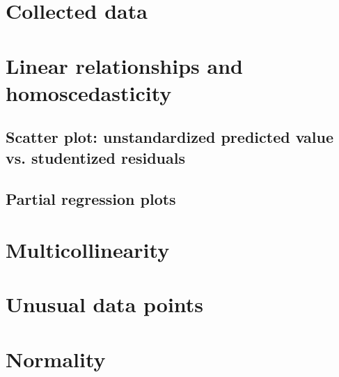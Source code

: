 \documentclass{sigchi}
\begin{document}




\clearpage
\onecolumn

\appendix
\section{Collected data} %
\label{sec:collected_data}


\section{Linear relationships and homoscedasticity}
\label{app:linear_relationships}

\subsection{Scatter plot: unstandardized predicted value vs. studentized residuals}
\hfill \break

\clearpage

\subsection{Partial regression plots}
\hfill \break


\clearpage

\section{Multicollinearity} %
\label{app:multicollinearity}
\hfill \break

\clearpage

\section{Unusual data points} %
\label{sec:unusual_data_points}
\hfill \break

\clearpage

\section{Normality} %
\label{app:normality}
\hfill \break

\clearpage
\end{document}
